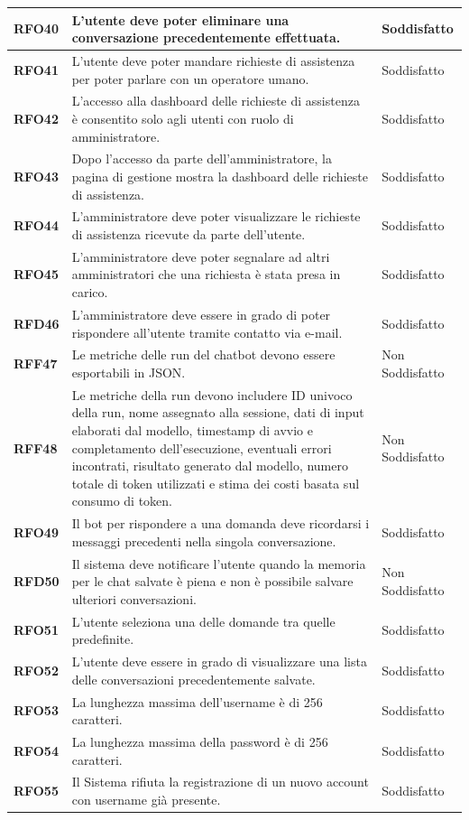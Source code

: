 \begin{longtable}{|>{\centering\arraybackslash}m{}|>{\centering\arraybackslash}m{}|>{\centering\arraybackslash}m{}|}
    \hline
    \textbf{RFO40} & L'utente deve poter eliminare una conversazione precedentemente effettuata. & Soddisfatto \\
    \hline
    \textbf{RFO41} & L'utente deve poter mandare richieste di assistenza per poter parlare con un operatore umano. & Soddisfatto \\
    \hline
    \textbf{RFO42} & L’accesso alla dashboard delle richieste di assistenza è consentito solo agli utenti con ruolo di amministratore. & Soddisfatto \\
    \hline
    \textbf{RFO43} & Dopo l’accesso da parte dell'amministratore, la pagina di gestione mostra la dashboard delle richieste di assistenza. & Soddisfatto \\
    \hline
    \textbf{RFO44} & L'amministratore deve poter visualizzare le richieste di assistenza ricevute da parte dell'utente. & Soddisfatto \\
    \hline
    \textbf{RFO45} & L'amministratore deve poter segnalare ad altri amministratori che una richiesta è stata presa in carico. & Soddisfatto \\
    \hline
    \textbf{RFD46} & L'amministratore deve essere in grado di poter rispondere all'utente tramite contatto via e-mail. & Soddisfatto \\
    \hline
    \textbf{RFF47} & Le metriche delle run del chatbot devono essere esportabili in JSON. & Non Soddisfatto \\
    \hline
    \textbf{RFF48} & Le metriche della run devono includere ID univoco della run, nome assegnato alla sessione, dati di input elaborati dal modello, timestamp di avvio e completamento dell'esecuzione, eventuali errori incontrati, risultato generato dal modello, numero totale di token utilizzati e stima dei costi basata sul consumo di token. & Non Soddisfatto \\
    \hline
    \textbf{RFO49} & Il bot per rispondere a una domanda deve ricordarsi i messaggi precedenti nella singola conversazione. & Soddisfatto \\
    \hline
    \textbf{RFD50} & Il sistema deve notificare l'utente quando la memoria per le chat salvate è piena e non è possibile salvare ulteriori conversazioni. & Non Soddisfatto \\
    \hline
    \textbf{RFO51} & L'utente seleziona una delle domande tra quelle predefinite. & Soddisfatto \\
    \hline
    \textbf{RFO52} & L'utente deve essere in grado di visualizzare una lista delle conversazioni precedentemente salvate. & Soddisfatto \\
    \hline
    \textbf{RFO53} & La lunghezza massima dell'username è di 256 caratteri. & Soddisfatto \\
    \hline
    \textbf{RFO54} & La lunghezza massima della password è di 256 caratteri. & Soddisfatto \\
    \hline
    \textbf{RFO55} & Il Sistema rifiuta la registrazione di un nuovo account con username già presente. & Soddisfatto \\
    \hline


\end{longtable}

